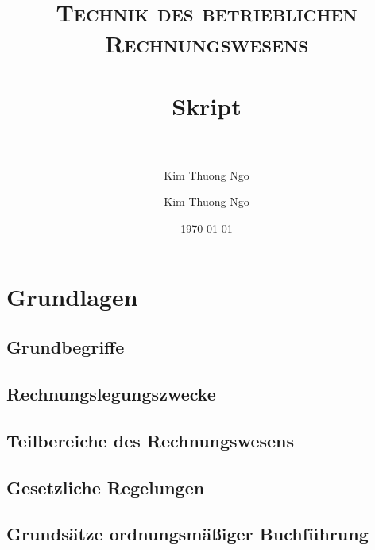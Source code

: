 \documentclass[paper=a4, fontsize=11pt]{scrartcl}
\author{Kim Thuong Ngo}
\title{
\normalfont \normalsize
\textsc{Technik des betrieblichen Rechnungswesens} \\ [25pt]
\horrule{0.5pt} \\[0.4cm]
\huge Skript \\
\horrule{2pt} \\[0.5cm]
}
\author{Kim Thuong Ngo}
\date{\normalsize\today}
\numberwithin{equation}{section}
\numberwithin{figure}{section}
\numberwithin{table}{section}
\begin{document}
\maketitle

\newpage

\tableofcontents

\newpage


\newpage

\section{Grundlagen}


\subsection{Grundbegriffe}


\subsection{Rechnungslegungszwecke}


\subsection{Teilbereiche des Rechnungswesens}


\subsection{Gesetzliche Regelungen}


\subsection{Grundsätze ordnungsmäßiger Buchführung}

\end{document}
